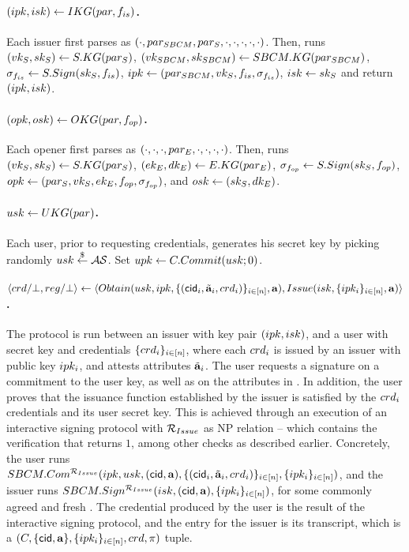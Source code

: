 \paragraph{$(ipk,isk) \gets IKG(par,f_{is})$.} %
Each issuer first parses \parm as $(\cdot,par_{SBCM},
par_{S},\cdot,\cdot,\cdot,\cdot,\cdot)$. Then, runs $(vk_{S},sk_{S}) \gets
S.KG(par_{S})$, $(vk_{SBCM},sk_{SBCM}) \gets SBCM.KG(par_{SBCM})$,
$\sigma_{f_{is}} \gets S.Sign(sk_{S},f_{is})$, $ipk \gets (par_{SBCM},vk_{S},
f_{is},\sigma_{f_{is}})$, $isk \gets sk_{S}$ and return $(ipk,isk)$.

\paragraph{$(opk,osk) \gets OKG(par,f_{op})$.} %
Each opener first parses \parm as $(\cdot,\cdot,
\cdot,par_{E},\cdot,\cdot,\cdot,\cdot)$. Then, runs $(vk_{S},sk_{S}) \gets S.KG
(par_{S})$, $(ek_{E},dk_{E}) \gets E.KG(par_{E})$, $\sigma_{f_{op}} \gets S.Sign
(sk_{S},f_{op})$, $opk \gets (par_{S},vk_{S},ek_{E},f_{op},\sigma_{f_{op}})$, and $osk
\gets (sk_{S},dk_{E})$.

\paragraph{$usk \gets UKG(par)$.} %
Each user, prior to requesting credentials, generates his secret key by picking
randomly $usk \stackrel{\$}{\gets} \mathcal{AS}$. Set $upk \gets C.Commit(usk;0)$.

\paragraph{$\langle crd/\bot,reg/\bot \rangle \gets
  \langle Obtain(usk,ipk,\lbrace (\mathsf{cid}_i,\tilde{\mathbf{a}}_i,crd_i) \rbrace_{i\in[n]},
  \mathbf{a}),Issue(isk,\lbrace ipk_i \rbrace_{i\in[n]},\mathbf{a})\rangle$.} %
The protocol is run between an issuer with key pair $(ipk,isk)$, and a user
with secret key \usk and credentials $\lbrace crd_i \rbrace_{i\in[n]}$, where
each $crd_i$ is issued by an issuer with public key $ipk_i$, and
attests attributes $\tilde{\mathbf{a}}_i$. The user requests a signature on a commitment to
the user key, as well as on the attributes in \attrs. In addition, the user
proves that the issuance function \fissue established by the issuer is satisfied
by the $crd_i$ credentials and its user secret key. This is achieved through
an execution of an \SBCM interactive signing protocol with $\mathcal{R}_{Issue}$
as NP relation -- which contains the verification that \fissue returns $1$,
among other checks as described earlier. Concretely, the user runs
$SBCM.Com^{\mathcal{R}_{Issue}}(ipk,usk,(\mathsf{cid},\mathbf{a}),\lbrace (\mathsf{cid}_i,\tilde{\mathbf{a}}_i,
crd_i)\rbrace_{i\in[n]},\lbrace ipk_i \rbrace_{i\in[n]})$, and the issuer
runs $SBCM.Sign^{\mathcal{R}_{Issue}}(isk,(\mathsf{cid},\mathbf{a}),\lbrace ipk_i
\rbrace_{i\in[n]})$, for some commonly agreed and fresh \cid. The credential
\cred produced by the user is the result of the interactive signing protocol,
and the \utrans entry for the issuer is its transcript, which is a $(C,
\lbrace \mathsf{cid},\mathbf{a}\rbrace,\lbrace ipk_i \rbrace_{i\in[n]},crd,\pi)$ tuple.

